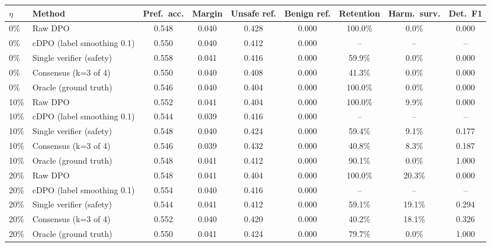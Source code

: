 \begin{tabular}{llccccccc}
\toprule
$\eta$ & Method & Pref.\ acc. & Margin & Unsafe ref. & Benign ref. & Retention & Harm.\ surv. & Det.\ F1 \\
\midrule
0\% & Raw DPO & 0.548 & 0.040 & 0.428 & 0.000 & 100.0\% & 0.0\% & 0.000 \\
0\% & cDPO (label smoothing 0.1) & 0.550 & 0.040 & 0.412 & 0.000 & -- & -- & -- \\
0\% & Single verifier (safety) & 0.558 & 0.041 & 0.416 & 0.000 & 59.9\% & 0.0\% & 0.000 \\
0\% & Consensus (k=3 of 4) & 0.550 & 0.040 & 0.408 & 0.000 & 41.3\% & 0.0\% & 0.000 \\
0\% & Oracle (ground truth) & 0.546 & 0.040 & 0.404 & 0.000 & 100.0\% & 0.0\% & 0.000 \\
\midrule
10\% & Raw DPO & 0.552 & 0.041 & 0.404 & 0.000 & 100.0\% & 9.9\% & 0.000 \\
10\% & cDPO (label smoothing 0.1) & 0.544 & 0.039 & 0.416 & 0.000 & -- & -- & -- \\
10\% & Single verifier (safety) & 0.548 & 0.040 & 0.424 & 0.000 & 59.4\% & 9.1\% & 0.177 \\
10\% & Consensus (k=3 of 4) & 0.546 & 0.039 & 0.432 & 0.000 & 40.8\% & 8.3\% & 0.187 \\
10\% & Oracle (ground truth) & 0.548 & 0.041 & 0.412 & 0.000 & 90.1\% & 0.0\% & 1.000 \\
\midrule
20\% & Raw DPO & 0.548 & 0.041 & 0.404 & 0.000 & 100.0\% & 20.3\% & 0.000 \\
20\% & cDPO (label smoothing 0.1) & 0.554 & 0.040 & 0.416 & 0.000 & -- & -- & -- \\
20\% & Single verifier (safety) & 0.544 & 0.041 & 0.412 & 0.000 & 59.1\% & 19.1\% & 0.294 \\
20\% & Consensus (k=3 of 4) & 0.552 & 0.040 & 0.420 & 0.000 & 40.2\% & 18.1\% & 0.326 \\
20\% & Oracle (ground truth) & 0.550 & 0.041 & 0.424 & 0.000 & 79.7\% & 0.0\% & 1.000 \\
\bottomrule
\end{tabular}
